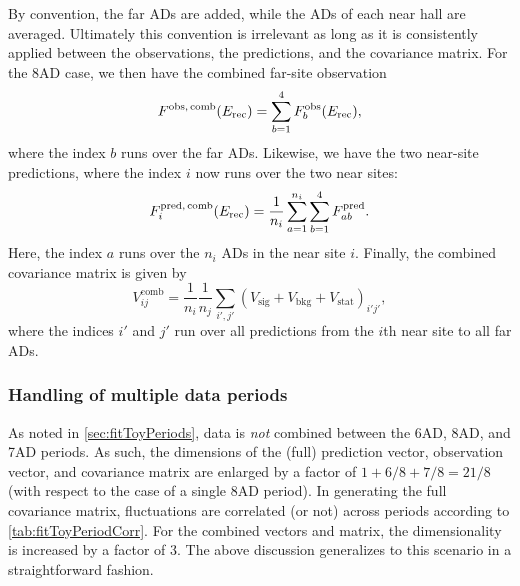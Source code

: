 \documentclass[../thesis.tex]{subfiles}
\begin{document}
By convention, the far ADs are added, while the ADs of each near hall are averaged. Ultimately this convention is irrelevant as long as it is consistently applied between the observations, the predictions, and the covariance matrix. For the 8AD case, we then have the combined far-site observation
\begin{equation}
  F^{\mathrm{obs},\,\mathrm{comb}}(E_\mathrm{rec}) = \sum_{b=1}^4 F^{\mathrm{obs}}_b(E_\mathrm{rec}),
\end{equation}
where the index $b$ runs over the far ADs. Likewise, we have the two near-site predictions, where the index $i$ now runs over the two near sites:
\begin{equation}
  F^{\mathrm{pred},\,\mathrm{comb}}_i (E_\mathrm{rec}) = \frac{1}{n_i} \sum_{a=1}^{n_i} \sum_{b=1}^4 F^{\mathrm{pred}}_{ab}.
\end{equation}
Here, the index $a$ runs over the $n_i$ ADs in the near site $i$. Finally, the combined covariance matrix is given by
\begin{equation}
  V^{\mathrm{comb}}_{ij} = \frac{1}{n_i} \frac{1}{n_j} \sum_{i',j'} (V_{\mathrm{sig}} + V_{\mathrm{bkg}} + V_{\mathrm{stat}})_{i'j'},
\end{equation}
where the indices $i'$ and $j'$ run over all predictions from the $i$th near site to all far ADs.

\subsubsection{Handling of multiple data periods}

As noted in \autoref{sec:fitToyPeriods}, data is \emph{not} combined between the 6AD, 8AD, and 7AD periods. As such, the dimensions of the (full) prediction vector, observation vector, and covariance matrix are enlarged by a factor of $1 + 6/8 + 7/8 = 21/8$ (with respect to the case of a single 8AD period). In generating the full covariance matrix, fluctuations are correlated (or not) across periods according to \autoref{tab:fitToyPeriodCorr}. For the combined vectors and matrix, the dimensionality is increased by a factor of 3. The above discussion generalizes to this scenario in a straightforward fashion.

\begin{comment}
What do we ultimately get? Check P14A technote. 2 (near sites) x 3 (periods) = 4 predictions, over 37 energy bins. Size of covariance matrix is thus 37 x 2 x 3.
\end{comment}

\begin{comment}
Data is summed across all ADs in each near site.
\end{comment}
\end{document}
